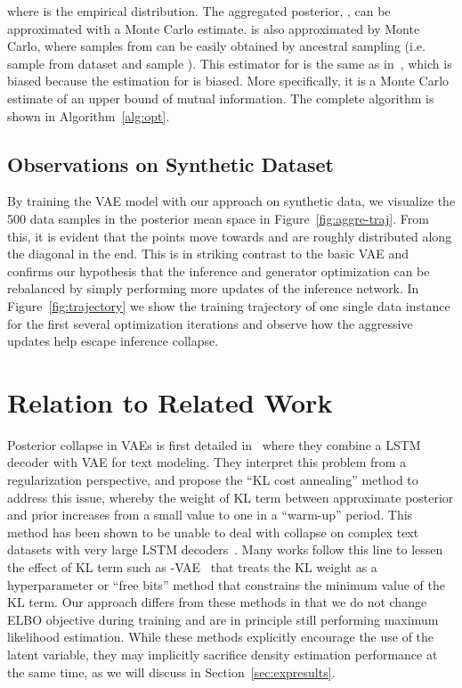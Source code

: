 \documentclass{article} \usepackage{iclr2019_conference,times}
\begin{document}
where  is the empirical distribution. The aggregated posterior, , can be approximated with a Monte Carlo estimate.
 is also approximated by Monte Carlo, where samples from  can be easily obtained by ancestral sampling (i.e. sample  from dataset and sample ). This estimator for  is the same as in~\citep{dieng2018avoiding}, which is biased because the estimation for  is biased. More specifically, it is a Monte Carlo estimate of an upper bound of mutual information. The complete algorithm is shown in Algorithm~\ref{alg:opt}.

\subsection{Observations on Synthetic Dataset}
By training the VAE model with our approach on synthetic data, we visualize the 500 data samples in the posterior mean space in Figure~\ref{fig:aggre-traj}.
From this, it is evident that the points move towards  and are roughly distributed along the diagonal in the end. This is in striking contrast to the basic VAE and confirms our hypothesis that the inference and generator optimization can be rebalanced by simply performing more updates of the inference network. In Figure~\ref{fig:trajectory} we show the training trajectory of one single data instance for the first several optimization iterations and observe how the aggressive updates help escape inference collapse.

\section{Relation to Related Work}
Posterior collapse in VAEs is first detailed in~\citep{bowman2015generating} where they combine a LSTM decoder with VAE for text modeling. They interpret this problem from a regularization perspective, and propose the ``KL cost annealing'' method to address this issue, whereby the weight of KL term between approximate posterior and prior increases from a small value to one in a ``warm-up'' period. This method has been shown to be unable to deal with collapse on complex text datasets with very large LSTM decoders~\citep{yang2017improved,kim2018semi}. Many works follow this line to lessen the effect of KL term such as -VAE~\citep{higgins2016beta} that treats the KL weight as a hyperparameter or ``free bits'' method that constrains the minimum value of the KL term. 
Our approach differs from these methods in that we do not change ELBO objective during training and are in principle still performing maximum likelihood estimation. While these methods explicitly encourage the use of the latent variable, they may implicitly sacrifice density estimation performance at the same time, as we will discuss in Section~\ref{sec:expresults}.
\end{document}
